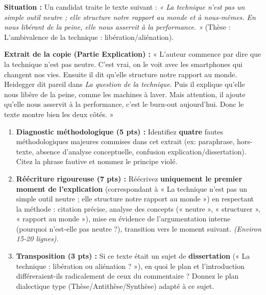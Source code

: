 \documentclass[11pt]{article}
\begin{document}
\begin{exercice}
\textbf{Situation :} Un candidat traite le texte suivant : \textit{« La technique n'est pas un simple outil neutre ; elle structure notre rapport au monde et à nous-mêmes. En nous libérant de la peine, elle nous asservit à la performance. »} (Thèse : L'ambivalence de la technique : libération/aliénation).

\textbf{Extrait de la copie (Partie Explication) :}
« L'auteur commence par dire que la technique n'est pas neutre. C'est vrai, on le voit avec les smartphones qui changent nos vies. Ensuite il dit qu'elle structure notre rapport au monde. Heidegger dit pareil dans \textit{La question de la technique}. Puis il explique qu'elle nous libère de la peine, comme les machines à laver. Mais attention, il ajoute qu'elle nous asservit à la performance, c'est le burn-out aujourd'hui. Donc le texte montre bien les deux côtés. »

\begin{enumerate}
    \item \textbf{Diagnostic méthodologique (5 pts) :} Identifiez \textbf{quatre} fautes méthodologiques majeures commises dans cet extrait (ex: paraphrase, hors-texte, absence d'analyse conceptuelle, confusion explication/dissertation). Citez la phrase fautive et nommez le principe violé.
    \item \textbf{Réécriture rigoureuse (7 pts) :} Réécrivez \textbf{uniquement le premier moment de l'explication} (correspondant à « La technique n'est pas un simple outil neutre ; elle structure notre rapport au monde ») en respectant la méthode : citation précise, analyse des concepts (« neutre », « structurer », « rapport au monde »), mise en évidence de l'argumentation interne (pourquoi n'est-elle pas neutre ?), transition vers le moment suivant. \textit{(Environ 15-20 lignes).}
    \item \textbf{Transposition (3 pts) :} Si ce texte était un sujet de \textbf{dissertation} (« La technique : libération ou aliénation ? »), en quoi le plan et l'introduction différeraient-ils radicalement de ceux du commentaire ? Donnez le plan dialectique type (Thèse/Antithèse/Synthèse) adapté à ce sujet.
\end{enumerate}
\end{exercice}
\end{document}

